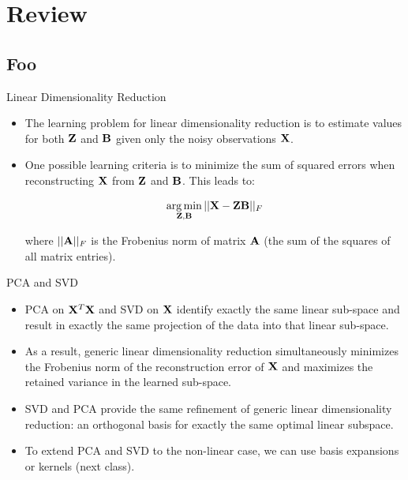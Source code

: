 \documentclass[serif,xcolor=pdftex,dvipsnames,table,hyperref={bookmarks=false,breaklinks}]{beamer}
\begin{document}
\maketitlepage


\section{Review}
\subsection{Foo}

\begin{frame}[t]{Linear Dimensionality Reduction}
 
\begin{itemize}
\item The learning problem for linear dimensionality reduction is to estimate
values for both ${\mathbf{Z}}$ and ${\mathbf{B}}$ given only the noisy observations 
${\mathbf{X}}$.

\item One possible learning criteria is to minimize the sum of squared 
errors when reconstructing ${\mathbf{X}}$ from ${\mathbf{Z}}$ and ${\mathbf{B}}$. This leads 
to:

{\Large
$$\operatorname*{arg\,min}_{{\mathbf{Z}},{\mathbf{B}}} ||{\mathbf{X}} - {\mathbf{Z}}{\mathbf{B}} ||_F$$
}

where $||{\mathbf{A}}||_F$ is the Frobenius norm of matrix  ${\mathbf{A}}$ (the sum of 
the squares of all matrix entries). 

\end{itemize} 
\end{frame}

\begin{frame}[t]{PCA and SVD}

\begin{itemize}
\item PCA on ${\mathbf{X}}^T{\mathbf{X}}$ and SVD on 
${\mathbf{X}}$ identify exactly the same linear sub-space and result in exactly the 
same projection of the data into that linear sub-space.

\item As a result, generic linear dimensionality reduction 
simultaneously minimizes the Frobenius norm of the reconstruction error of 
${\mathbf{X}}$ and maximizes the retained variance in the learned sub-space.

\item SVD and PCA provide the same refinement of generic linear 
dimensionality reduction: an orthogonal basis for exactly the same optimal 
linear subspace. 

\item To extend PCA and SVD to the non-linear case, we can use basis expansions 
or kernels (next class).

\end{itemize} 
\end{frame}
\end{document}
